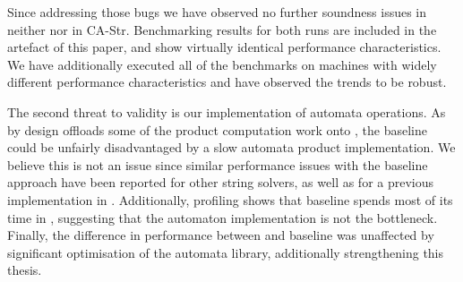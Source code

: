 Since addressing those bugs we have observed no further soundness
issues in neither \Catra{} nor in CA-Str. Benchmarking results for both runs are included
in the artefact of this paper, and show virtually identical performance characteristics. We have
additionally executed all of the benchmarks on machines with widely different performance
characteristics and have observed the trends to be robust.

The second threat to validity is our implementation of automata operations. As
\Calculus{} by design offloads some of the product computation work onto
\Princess{}, the baseline could be unfairly disadvantaged by a slow automata
product implementation. We believe this is not an issue since similar
performance issues with the baseline approach have been reported for other string
solvers, as well as for a previous implementation in \Ostrich{}. Additionally,
profiling shows that baseline spends most of its time in
\Princess{}, suggesting that the automaton implementation is not the bottleneck.
Finally, the difference in performance between \Calculus{} and baseline was unaffected
 by significant optimisation of the automata library, additionally
strengthening this thesis.

